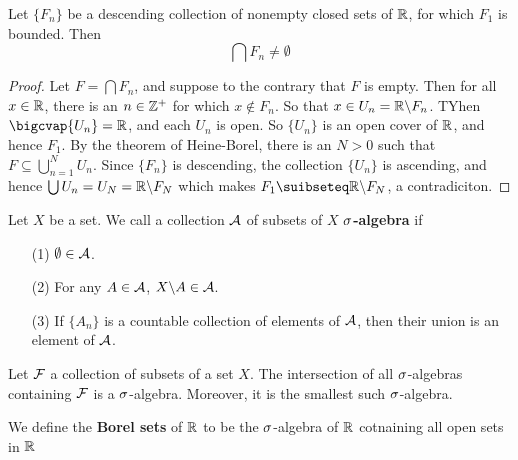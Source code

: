 \begin{theorem}\label{1.1.6}
    Let $\{F_n\}$ be a descending collection of nonempty closed sets of $\mathbb{R}$,
    for which  $F_1$ is bounded. Then
    \begin{equation*}
        \bigcap{F_n} \neq \emptyset
    \end{equation*}
\end{theorem}
\begin{proof}
    Let $F=\bigcap{F_n}$, and suppose to the contrary that $F$ is empty. Then
    for all  $x \in \mathbb{R}$, there is an  $n \in \mathbb{Z}^+$ for which  $x \notin F_n$. So
    that  $x \in U_n=\mathbb{R}\backslash F_n$. TYhen $\bigcvap{U_n}=\R$, and each $U_n$ is
    open. So  $\{U_n\}$ is an open cover of $\mathbb{R}$, and hence $F_1$. By the
    theorem of Heine-Borel, there is an $N>0$ such that  $F \subseteq
    \bigcup_{n=1}^N{U_n}$. Since $\{F_n\}$ is descending, the collection
    $\{U_n\}$ is ascending, and hence $\bigcup{U_n}=U_N=\mathbb{R}\backslash F_N$ which
    makes $F_1 \suibseteq \com{\R}{F_N}$, a contradiciton.
\end{proof}

\begin{definition}
    Let $X$ be a set. We call a collection  $\mathcal{A}$ of subsets of  $X$
    \textbf{$\sigma$-algebra} if
    \begin{enumerate}
        \item[(1)] $\emptyset \in \mathcal{A}$.

        \item[(2)] For any $A \in \mathcal{A}$,  $X\backslash A \in \mathcal{A}$.

        \item[(3)] If $\{A_n\}$ is a countable collection of elements of $\mathcal{A}$,
            then their union is an element of  $\mathcal{A}$.
    \end{enumerate}
\end{definition}

\begin{lemma}\label{1.1.7}
    Let $\mathcal{F}$ a collection of subsets of a set $X$. The intersection of all
    $\sigma$-algebras containing  $\mathcal{F}$ is a  $\sigma$-algebra. Moreover, it is the
    smallest such  $\sigma$-algebra.
\end{lemma}

\begin{definition}
    We define the \textbf{Borel sets} of $\mathbb{R}$ to be the  $\sigma$-algebra of  $\mathbb{R}$
    cotnaining all open sets in  $\mathbb{R}$
\end{definition}
